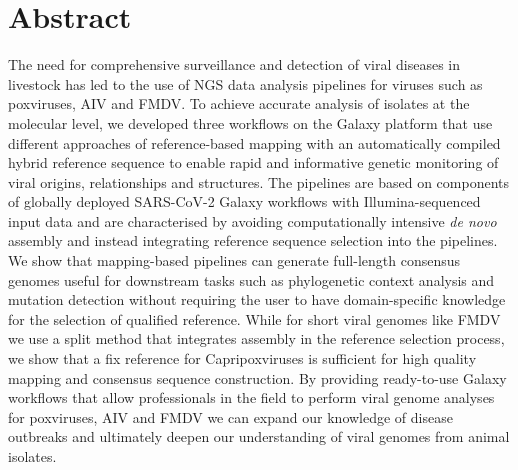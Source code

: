 \chapter*{Abstract}
The need for comprehensive surveillance and detection of viral diseases in livestock has led to the use of \ac{NGS} data analysis pipelines for viruses such as poxviruses, \ac{AIV} and \ac{FMDV}. To achieve accurate analysis of isolates at the molecular level, we developed three workflows on the Galaxy platform that use different approaches of reference-based mapping with an automatically compiled hybrid reference sequence to enable rapid and informative genetic monitoring of viral origins, relationships and structures. The pipelines are based on components of globally deployed SARS-CoV-2 Galaxy workflows with Illumina-sequenced input data and are characterised by avoiding computationally intensive \textit{de novo} assembly and instead integrating reference sequence selection into the pipelines. We show that mapping-based pipelines can generate full-length consensus genomes useful for downstream tasks such as phylogenetic context analysis and mutation detection without requiring the user to have domain-specific knowledge for the selection of qualified reference. While for short viral genomes like \ac{FMDV} we use a split method that integrates assembly in the reference selection process, we show that a fix reference for Capripoxviruses is sufficient for high quality mapping and consensus sequence construction. By providing ready-to-use Galaxy workflows that allow professionals in the field to perform viral genome analyses for poxviruses, \ac{AIV} and \ac{FMDV} we can expand our knowledge of disease outbreaks and ultimately deepen our understanding of viral genomes from animal isolates.